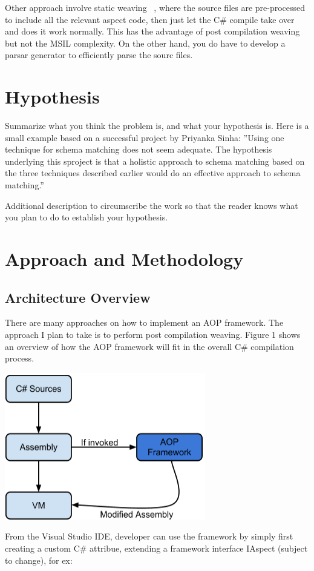 Other approach involve static weaving ~\cite{aspectcs}, where the source files are pre-processed to include all the relevant aspect code, then just let the C\# compile take over and does it work normally. This has the advantage of post compilation weaving but not the MSIL complexity. On the other hand, you do have to develop a parsar generator to efficiently parse the sourc files.

\section{Hypothesis}
Summarize what you think the problem is, and what your hypothesis
is. Here is a small example based on a successful project by Priyanka
Sinha: ''Using one technique for schema matching does not seem
adequate. The hypothesis underlying this sproject is that a holistic
approach to schema matching based on the three techniques described
earlier would do an effective approach to schema matching.''

Additional description to circumscribe the work so that the reader
knows what you plan to do to establish your hypothesis.

\section{Approach and Methodology}
\subsection{Architecture Overview}
There are many approaches on how to implement an AOP framework. The approach I plan to take is to perform post compilation weaving. Figure 1 shows an overview of how the AOP framework will fit in the overall C\# compilation process.

\includegraphics[scale=0.70]{model_overview.png}

From the Visual Studio IDE, developer can use the framework by simply first creating a custom C\# attribue, extending a framework interface IAspect (subject to change), for ex:

